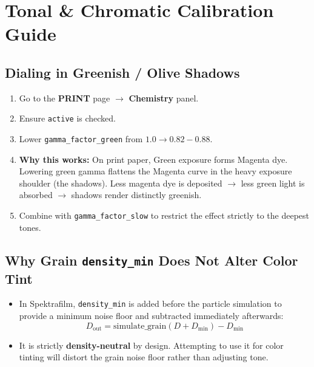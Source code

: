 \documentclass[11pt,a4paper]{article}
\begin{document}
\newpage

\section{Tonal \& Chromatic Calibration Guide}

\subsection{Dialing in Greenish / Olive Shadows}
\begin{enumerate}[leftmargin=*]
    \item Go to the \textbf{PRINT} page $\to$ \textbf{Chemistry} panel.
    \item Ensure \texttt{active} is checked.
    \item Lower \texttt{gamma\_factor\_green} from $1.0 \longrightarrow 0.82 - 0.88$.
    \item \textbf{Why this works:} On print paper, Green exposure forms Magenta dye. Lowering green gamma flattens the Magenta curve in the heavy exposure shoulder (the shadows). Less magenta dye is deposited $\longrightarrow$ less green light is absorbed $\longrightarrow$ shadows render distinctly greenish.
    \item Combine with \texttt{gamma\_factor\_slow} to restrict the effect strictly to the deepest tones.
\end{enumerate}

\subsection{Why Grain \texttt{density\_min} Does Not Alter Color Tint}
\begin{itemize}[leftmargin=*]
    \item In Spektrafilm, \texttt{density\_min} is added before the particle simulation to provide a minimum noise floor and subtracted immediately afterwards:
    \begin{equation}
    D_{\text{out}} = \mathrm{simulate\_grain}(D + D_{\min}) - D_{\min}
    \end{equation}
    \item It is strictly \textbf{density-neutral} by design. Attempting to use it for color tinting will distort the grain noise floor rather than adjusting tone.
\end{itemize}
\end{document}
